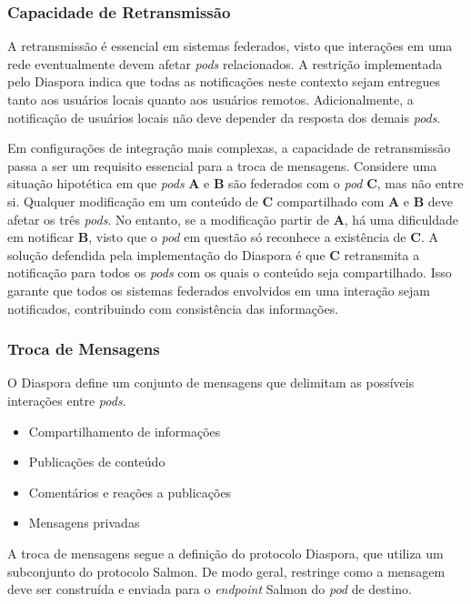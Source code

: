 \subsubsection{Capacidade de Retransmissão}

A retransmissão é essencial em sistemas federados, visto que interações em uma rede
eventualmente devem afetar \textit{pods} relacionados. A restrição implementada
pelo Diaspora indica que todas as notificações neste contexto sejam entregues tanto
aos usuários locais quanto aos usuários remotos. Adicionalmente, a notificação de
usuários locais não deve depender da resposta dos demais \textit{pods}.

Em configurações de integração mais complexas, a capacidade de retransmissão passa a
ser um requisito essencial para a troca de mensagens. Considere uma situação
hipotética em que \textit{pods} \textbf{A} e \textbf{B} são federados com o
\textit{pod} \textbf{C}, mas não entre si. Qualquer modificação em um conteúdo de 
\textbf{C} compartilhado com \textbf{A} e \textbf{B} deve afetar os três 
\textit{pods}. No entanto, se a modificação partir de \textbf{A}, há uma dificuldade
em notificar \textbf{B}, visto que o \textit{pod} em questão só reconhece a 
existência de \textbf{C}. A solução defendida pela implementação do Diaspora é que
\textbf{C} retransmita a notificação para todos os \textit{pods} com os quais o
conteúdo seja compartilhado. Isso garante que todos os sistemas federados envolvidos
em uma interação sejam notificados, contribuindo com consistência das informações.

\subsubsection{Troca de Mensagens}

O Diaspora define um conjunto de mensagens que delimitam as possíveis interações 
entre \textit{pods}.

\begin{itemize}
  \item{Compartilhamento de informações}
  \item{Publicações de conteúdo}
  \item{Comentários e reações a publicações}
  \item{Mensagens privadas}
\end{itemize}

A troca de mensagens segue a definição do protocolo Diaspora, que utiliza um
subconjunto do protocolo Salmon. De modo geral, restringe como a mensagem deve ser
construída e enviada para o \textit{endpoint} Salmon do \textit{pod} de destino. 

